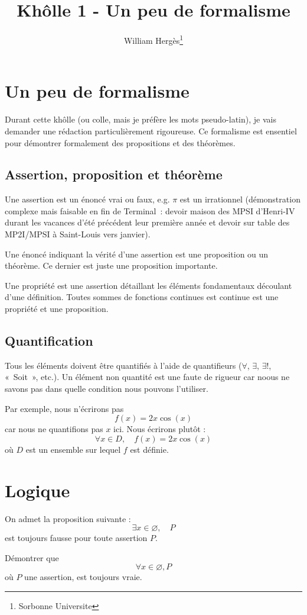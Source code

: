 \documentclass[a4paper, titlepage]{article}
\title{Khôlle 1 - Un peu de formalisme}
\author{William Hergès\thanks{Sorbonne Universite}}
\begin{document}
	\maketitle
	\tableofcontents
	\newpage
	\section{Un peu de formalisme}
	Durant cette khôlle (ou colle, mais je préfère les mots pseudo-latin), je vais demander une rédaction particulièrement rigoureuse. Ce formalisme est ensentiel pour démontrer formalement des propositions et des théorèmes.
	\subsection{Assertion, proposition et théorème}
	Une assertion est un énoncé vrai ou faux, e.g. $\pi$ est un irrationnel (démonstration complexe mais faisable en fin de Terminal~: devoir maison des MPSI d'Henri-IV durant les vacances d'été précédent leur première année et devoir sur table des MP2I/MPSI à Saint-Louis vers janvier).

	Une énoncé indiquant la vérité d'une assertion est une proposition ou un théorème. Ce dernier est juste une proposition importante.

	Une propriété est une assertion détaillant les éléments fondamentaux découlant d'une définition. Toutes sommes de fonctions continues est continue est une propriété et une proposition.
	\subsection{Quantification}
	Tous les éléments doivent être quantifiés à l'aide de quantifieurs ($\forall$, $\exists$, $\exists!$, «~Soit~», etc.). Un élément non quantité est une faute de rigueur car noous ne savons pas dans quelle condition nous pouvons l'utiliser.

	Par exemple, nous n'écrirons pas $$f(x)=2x\cos(x)$$ car nous ne quantifions pas $x$ ici. Nous écrirons plutôt : $$ \forall x\in D,\quad f(x)=2x\cos(x) $$ où $D$ est un ensemble sur lequel $f$ est définie.
	\section{Logique}
	On admet la proposition suivante :
	$$ \exists x\in\varnothing,\quad P $$
	est toujours fausse pour toute assertion $P$.

	Démontrer que $$ \forall x\in\varnothing, P $$ où $P$ une assertion, est toujours vraie.
\end{document}
